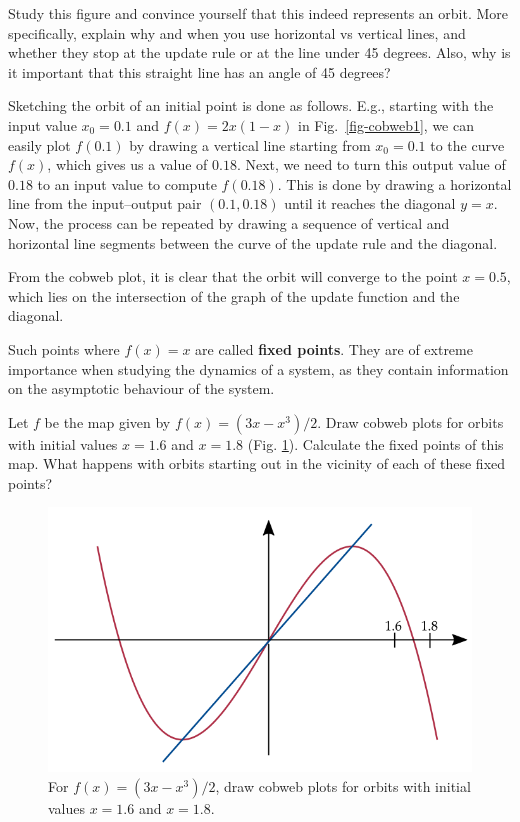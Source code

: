 \begin{cue}
Study this figure and convince yourself that this indeed represents an orbit. More specifically, explain why and when you use horizontal vs vertical lines, and whether they stop at the update rule or at the line under 45 degrees. Also, why is it important that this straight line has an angle of 45 degrees?
\end{cue}

Sketching the orbit of an initial point is done as follows. E.g., starting with the input value $x_0=0.1$ and $f(x)=2x(1-x)$ in Fig.~\ref{fig-cobweb1}, we can easily plot $f(0.1)$ by drawing a vertical line starting from $x_0=0.1$ to the curve $f(x)$, which gives us a value of $0.18$. Next, we need to turn this output value of $0.18$ to an input value to compute $f(0.18)$. This is done by drawing a horizontal line from the input--output pair $(0.1,0.18)$ until it reaches the diagonal $y=x$. Now, the process can be repeated by drawing a sequence of vertical and horizontal line segments between the curve of the update rule and the diagonal.

\noindent{}From the cobweb plot, it is clear that the orbit will converge to the point $x=0.5$, which lies on the intersection of the graph of the update function and the diagonal.

Such points where $f(x)=x$ are called \textbf{fixed points}. They are of extreme importance when studying the dynamics of a system, as they contain information on the asymptotic behaviour of the system.

\begin{exer}
Let $f$ be the map given by $f(x) = (3x-x^3)/2$. Draw cobweb plots for orbits with initial values $x=1.6$ and $x=1.8$ (Fig. \ref{fig-cobweb-ex}). Calculate the fixed points of this map. What happens with orbits starting out in the vicinity of each of these fixed points?
\end{exer}

\begin{figure}
\centering
\includegraphics{dynamic/figures/cobweb_ex}
\caption{For $f(x) = (3x-x^3)/2$, draw cobweb plots for orbits with initial values $x=1.6$ and $x=1.8$.}
\label{fig-cobweb-ex}
\end{figure} 


